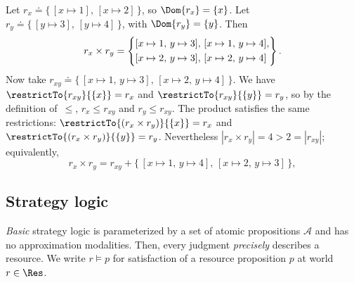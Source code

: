 \begin{example}
  Let $r_x \doteq \{\,[x \mapsto 1],\, [x \mapsto 2]\,\}$, so
  $\Dom{r_x} = \{x\}$.
  Let $r_y \doteq \{\,[y \mapsto 3],\, [y \mapsto 4]\,\}$, with $\Dom{r_y} = \{y\}$.
  Then
  \[
    r_x \times r_y
    = \left\{
      \begin{array}{@{}l@{}}
        [x \mapsto 1,\, y \mapsto 3],\,
        [x \mapsto 1,\, y \mapsto 4],\\[\jot]
        [x \mapsto 2,\, y \mapsto 3],\,
        [x \mapsto 2,\, y \mapsto 4]
      \end{array}
    \right\}.
  \]
  Now take
  $r_{xy} \doteq \{\, [x \mapsto 1,\, y \mapsto 3],\, [x \mapsto 2,\, y \mapsto 4]\,\}$.
  We have
  $\restrictTo{r_{xy}}{\{x\}} = r_x$ and $\restrictTo{r_{xy}}{\{y\}} = r_y$,
  so by the definition of~$\leq$,
  $r_x \leq r_{xy}$ and $r_y \leq r_{xy}$.
  The product satisfies the same restrictions:
  $\restrictTo{(r_x \times r_y)}{\{x\}} = r_x$ and
  $\restrictTo{(r_x \times r_y)}{\{y\}} = r_y$.
  Nevertheless $|r_x \times r_y| = 4 > 2 = |r_{xy}|$; equivalently,
  \[
    r_x \times r_y
    = r_{xy} + \{\, [x \mapsto 1,\, y \mapsto 4],\, [x \mapsto 2,\, y \mapsto 3] \,\},
  \]
  \end{example}

\subsection{Strategy logic}

\emph{Basic} strategy logic is parameterized by a set of atomic propositions $\mathcal{A}$ and has no approximation modalities. Then, every judgment \emph{precisely} describes a resource.
We write $r \models p$ for satisfaction of a resource proposition $p$
at world $r \in \Res$.

